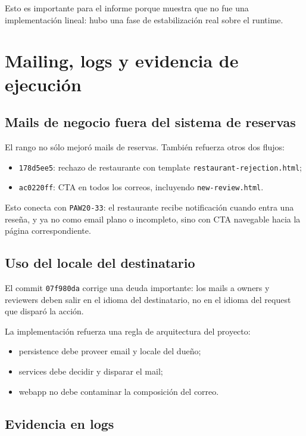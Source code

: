 \documentclass[11pt,a4paper]{report}
\newcommand{\commit}[1]{\texttt{#1}}
\newcommand{\code}[1]{\nolinkurl{#1}}
\newcommand{\story}[1]{\texttt{#1}}
\begin{document}
Esto es importante para el informe porque muestra que no fue una implementaci\'on lineal: hubo una fase de estabilizaci\'on real sobre el runtime.

\chapter{Mailing, logs y evidencia de ejecuci\'on}

\section{Mails de negocio fuera del sistema de reservas}

El rango no s\'olo mejor\'o mails de reservas. Tambi\'en refuerza otros dos flujos:

\begin{itemize}
  \item \commit{178d5ee5}: rechazo de restaurante con template \code{restaurant-rejection.html};
  \item \commit{ac0220ff}: CTA en todos los correos, incluyendo \code{new-review.html}.
\end{itemize}

Esto conecta con \story{PAW20-33}: el restaurante recibe notificaci\'on cuando entra una rese\~na, y ya no como email plano o incompleto, sino con CTA navegable hacia la p\'agina correspondiente.

\section{Uso del locale del destinatario}

El commit \commit{07f980da} corrige una deuda importante: los mails a owners y reviewers deben salir en el idioma del destinatario, no en el idioma del request que dispar\'o la acci\'on.

La implementaci\'on refuerza una regla de arquitectura del proyecto:

\begin{itemize}
  \item persistence debe proveer email y locale del due\~no;
  \item services debe decidir y disparar el mail;
  \item webapp no debe contaminar la composici\'on del correo.
\end{itemize}

\section{Evidencia en logs}
\end{document}
